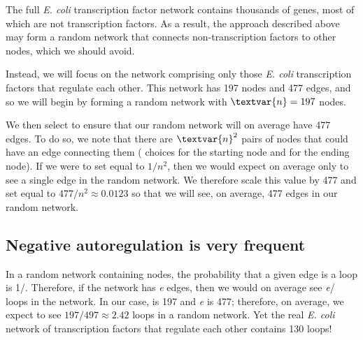 
\begin{qbox}\end{qbox}

The full \textit{E. coli} transcription factor network contains thousands of genes, most of which are not transcription factors. As a result, the approach described above may form a random network that connects non-transcription factors to other nodes, which we should avoid.

Instead, we will focus on the network comprising only those \textit{E. coli} transcription factors that regulate each other. This network has 197 nodes and 477 edges, and so we will begin by forming a random network with $\textvar{n} = 197$ nodes.

We then select  to ensure that our random network will on average have 477 edges. To do so, we note that there are $\textvar{n}^2$ pairs of nodes that could have an edge connecting them ( choices for the starting node and  for the ending node). If we were to set  equal to $1/n^2$, then we would expect on average only to see a single edge in the random network. We therefore scale this value by 477 and set  equal to $477/n^2 \approx 0.0123$ so that we will see, on average, 477 edges in our random network.

\FloatBarrier
{}
\subsection{Negative autoregulation is very frequent}

In a random network containing  nodes, the probability that a given edge is a loop is 1/. Therefore, if the network has \textit{e} edges, then we would on average see \textit{e}/ loops in the network. In our case,  is 197 and \textit{e} is 477; therefore, on average, we expect to see $197/497 \approx 2.42$ loops in a random network. Yet the real \textit{E. coli} network of transcription factors that regulate each other contains 130 loops!

